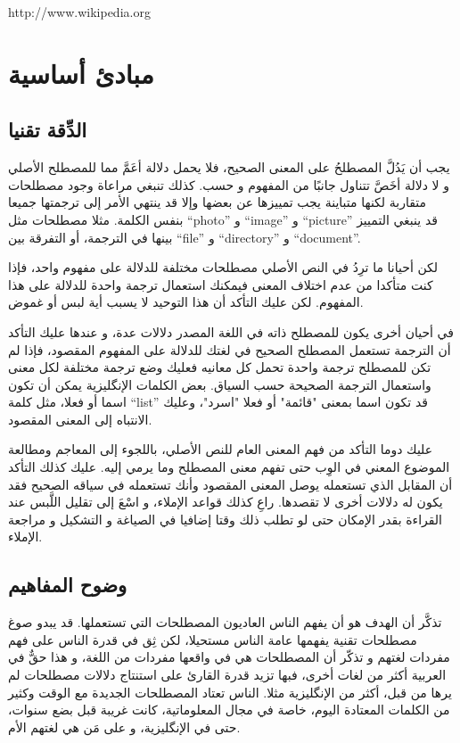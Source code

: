 http://www.wikipedia.org

\section{مبادئ أساسية}
\subsection{الدِّقة تقنيا}
يجب أن يَدُلَّ المصطلحُ على المعنى الصحيح، فلا يحمل دلالة أعَمَّ مما
للمصطلح الأصلي و لا دلالة أخَصَّ تتناول جانبًا من المفهوم و حسب. كذلك
تنبغي مراعاة وجود مصطلحات متقاربة لكنها متباينة يجب تمييزها عن بعضها
وإلا قد ينتهي الأمر إلى ترجمتها جميعا بنفس الكلمة. مثلا مصطلحات مثل
“photo” و “image” و “picture” قد ينبغي التمييز بينها في الترجمة، أو
التفرقة بين “file” و “directory” و “document”.

لكن أحيانا ما ترِدُ في النص الأصلي مصطلحات مختلفة للدلالة على مفهوم
واحد، فإذا كنت متأكدا من عدم اختلاف المعنى فيمكنك استعمال ترجمة واحدة
للدلالة على هذا المفهوم. لكن عليك التأكد أن هذا التوحيد لا يسبب أية لبس
أو غموض.

في أحيان أخرى يكون للمصطلح ذاته في اللغة المصدر دلالات عدة، و عندها عليك
التأكد أن الترجمة تستعمل المصطلح الصحيح في لغتك للدلالة على المفهوم
المقصود، فإذا لم تكن للمصطلح ترجمة واحدة تحمل كل معانيه فعليك وضع ترجمة
مختلفة لكل معنى واستعمال الترجمة الصحيحة حسب السياق. بعض الكلمات
الإنگليزية يمكن أن تكون اسما أو فعلا، مثل كلمة “list” قد تكون اسما
بمعنى "قائمة" أو فعلا "اسرد"، وعليك الانتباه إلى المعنى المقصود.

عليك دوما التأكد من فهم المعنى العام للنص الأصلي، باللجوء إلى المعاجم
ومطالعة الموضوع المعني في الوِب حتى تفهم معنى المصطلح وما يرمي إليه.
عليك كذلك التأكد أن المقابل الذي تستعمله يوصل المعنى المقصود وأنك
تستعمله في سياقه الصحيح فقد يكون له دلالات أخرى لا تقصدها. راعِ كذلك
قواعد الإملاء، و اسْعَ إلى تقليل اللَّبس عند القراءة بقدر الإمكان حتى
لو تطلب ذلك وقتا إضافيا في الصياغة و التشكيل و مراجعة الإملاء.

\subsection{وضوح المفاهيم}
تذكَّر أن الهدف هو أن يفهم الناس العاديون المصطلحات التي تستعملها. قد
يبدو صوغ مصطلحات تقنية يفهمها عامة الناس مستحيلا، لكن ثِق في قدرة الناس
على فهم مفردات لغتهم و تذكّر أن المصطلحات هي في واقعها مفردات من اللغة،
و هذا حقٌّ في العربية أكثر من لغات أخرى، فبها تزيد قدرة القارئ على
استنتاج دلالات مصطلحات لم يرها من قبل، أكثر من الإنگليزية مثلا. الناس
تعتاد المصطلحات الجديدة مع الوقت وكثير من الكلمات المعتادة اليوم، خاصة
في مجال المعلوماتية، كانت غريبة قبل بضع سنوات، حتى في الإنگليزية، و على
مَن هي لغتهم الأم.

